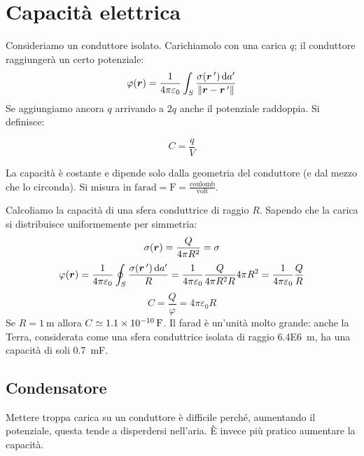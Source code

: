 \section{Capacità elettrica}
Consideriamo un conduttore isolato. Carichiamolo con una carica $q$; il conduttore raggiungerà un certo potenziale:
\[\varphi(\boldsymbol{r})=\frac{1}{4\pi\varepsilon_0}\int_S\frac{\sigma(\boldsymbol{r}\,')\,\mathrm{d} a'}{\left\lVert\boldsymbol{r}-\boldsymbol{r}\,'\right\rVert}\]
Se aggiungiamo ancora $q$ arrivando a $2q$ anche il potenziale raddoppia. Si definisce:
\begin{Def}
  \begin{equation}
    C=\frac{q}{V}
  \end{equation}
\end{Def}
La capacità è costante e dipende solo dalla geometria del conduttore (e dal mezzo che lo circonda). Si misura in $\text{farad}=\si{\farad}=\frac{\text{coulomb}}{\text{volt}}$.
\begin{Es}[sfera]
  Calcoliamo la capacità di una sfera conduttrice di raggio $R$. Sapendo che la carica si distribuisce uniformemente per simmetria:
  \[\sigma(\boldsymbol{r})=\frac{Q}{4\pi R^2}=\sigma\]
  \[\varphi(\boldsymbol{r})=\frac{1}{4\pi\varepsilon_0}\oint_S\frac{\sigma(\boldsymbol{r}\,')\,\mathrm{d} a'}{R}=\frac{1}{4\pi\varepsilon_0}\frac{Q}{4\pi R^2 R}4\pi R^2=\frac{1}{4\pi\varepsilon_0}\frac{Q}{R}\]
  \[C=\frac{Q}{\varphi}=4\pi\varepsilon_0R\]
  Se $R=\SI{1}{\metre}$ allora $C\simeq\SI{1.1E-10}{\farad}$. Il farad è un'unità molto grande: anche la Terra, considerata come una sfera conduttrice isolata di raggio \SI{6.4E6}{\meter}, ha una capacità di soli \SI{0.7}{\milli\farad}.
\end{Es}
\subsection{Condensatore}
Mettere troppa carica su un conduttore è difficile perché, aumentando il potenziale, questa tende a disperdersi nell'aria. \`E invece più pratico aumentare la capacità.

